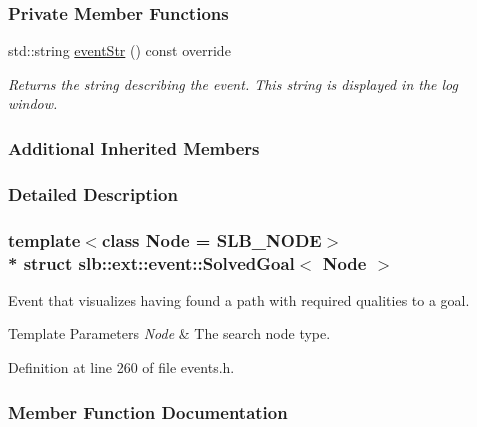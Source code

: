 \subsubsection*{Private Member Functions}
\begin{DoxyCompactItemize}
\item 
std\+::string \hyperlink{structslb_1_1ext_1_1event_1_1SolvedGoal_a0c6086b08a15d7e12217003aac43a0a8}{event\+Str} () const override
\begin{DoxyCompactList}\small\item\em Returns the string describing the event. This string is displayed in the log window. \end{DoxyCompactList}\end{DoxyCompactItemize}
\subsubsection*{Additional Inherited Members}


\subsubsection{Detailed Description}
\subsubsection*{template$<$class Node = S\+L\+B\+\_\+\+N\+O\+DE$>$\\*
struct slb\+::ext\+::event\+::\+Solved\+Goal$<$ Node $>$}

Event that visualizes having found a path with required qualities to a goal. 


\begin{DoxyTemplParams}{Template Parameters}
{\em Node} & The search node type. \\
\hline
\end{DoxyTemplParams}


Definition at line 260 of file events.\+h.



\subsubsection{Member Function Documentation}
